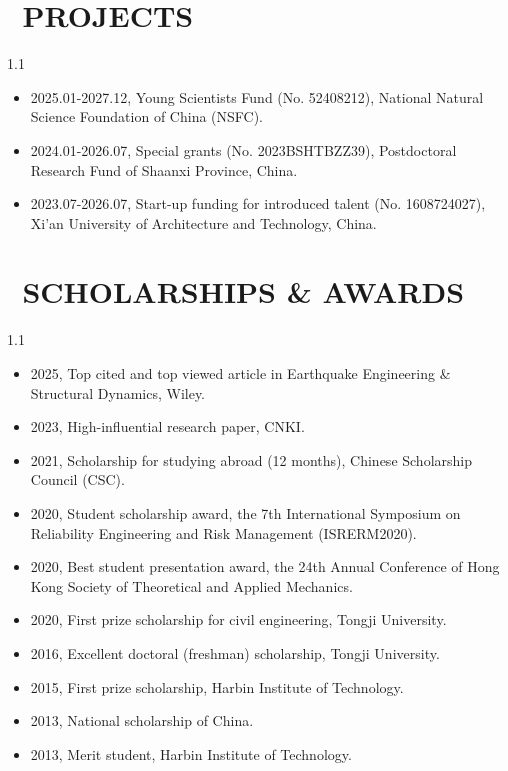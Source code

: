 \documentclass{resume}
\begin{document}
\section{\faArchive\;\, PROJECTS}
\begin{spacing}{1.1}
\begin{itemize} [itemsep=4pt,topsep=3pt]
  \item 2025.01-2027.12,  Young Scientists Fund (No. 52408212), National Natural Science Foundation of China (NSFC).
  
  \item 2024.01-2026.07, Special grants (No. 2023BSHTBZZ39), Postdoctoral Research Fund of Shaanxi Province, China.

  \item 2023.07-2026.07, Start-up funding for introduced talent (No. 1608724027), Xi'an University of Architecture and Technology, China.
\end{itemize}
\end{spacing}

\section{\faAward\;\, SCHOLARSHIPS \& AWARDS}
 \begin{spacing}{1.1}
\begin{itemize} [itemsep=4pt,topsep=3pt]
  \item 2025, Top cited and top viewed article in Earthquake Engineering \& Structural Dynamics, Wiley.
  \item 2023, High-influential research paper, CNKI.
  \item 2021, Scholarship for studying abroad (12 months), Chinese Scholarship Council (CSC).
  \item 2020, Student scholarship award, the 7th International Symposium on Reliability Engineering and Risk Management (ISRERM2020).
  \item 2020, Best student presentation award, the 24th Annual Conference of Hong Kong Society of Theoretical and Applied Mechanics.
  \item 2020, First prize scholarship for civil engineering, Tongji University.
  \item 2016, Excellent doctoral (freshman) scholarship, Tongji University.
  \item 2015, First prize scholarship, Harbin Institute of Technology.
  \item 2013, National scholarship of China.
  \item 2013, Merit student, Harbin Institute of Technology.
\end{itemize}
 \end{spacing}
\end{document}
